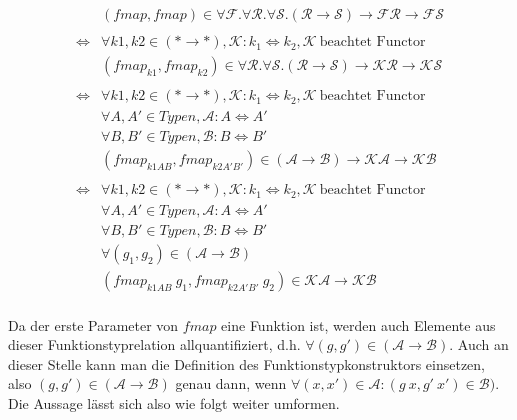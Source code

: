 \begin{align*}
&(fmap, fmap) \in \forall \mathcal{F} . \forall \mathcal{R} . \forall \mathcal{S} . (\mathcal{R} \rightarrow \mathcal{S})
\rightarrow \mathcal{F} \mathcal{R} \rightarrow \mathcal{F} \mathcal{S} \\
&\\
\Leftrightarrow &
\forall k1, k2 \in (* \rightarrow *), \mathcal{K} : k_1 \Leftrightarrow k_2, \mathcal{K}~\text{beachtet Functor} \\
&(fmap_{k1}, fmap_{k2}) \in \forall \mathcal{R} . \forall \mathcal{S} . (\mathcal{R} \rightarrow \mathcal{S}) \rightarrow
\mathcal{K} \mathcal{R} \rightarrow \mathcal{K} \mathcal{S} \\
&\\
\Leftrightarrow &
\forall k1, k2 \in (* \rightarrow *), \mathcal{K} : k_1 \Leftrightarrow k_2, \mathcal{K}~\text{beachtet Functor} \\
&\forall A, A' \in Typen, \mathcal{A} : A \Leftrightarrow A' \\
&\forall B, B' \in Typen, \mathcal{B} : B \Leftrightarrow B' \\
&(fmap_{k1 A B}, fmap_{k2 A' B'}) \in (\mathcal{A} \rightarrow \mathcal{B}) \rightarrow
\mathcal{K} \mathcal{A} \rightarrow \mathcal{K} \mathcal{B} \\
&\\
\Leftrightarrow &
\forall k1, k2 \in (* \rightarrow *), \mathcal{K} : k_1 \Leftrightarrow k_2, \mathcal{K}~\text{beachtet Functor} \\
&\forall A, A' \in Typen, \mathcal{A} : A \Leftrightarrow A' \\
&\forall B, B' \in Typen, \mathcal{B} : B \Leftrightarrow B' \\
&\forall (g_1, g_2) \in (\mathcal{A} \rightarrow \mathcal{B}) \\
&(fmap_{k1 A B}\ g_1, fmap_{k2 A' B'}\ g_2) \in \mathcal{K} \mathcal{A} \rightarrow \mathcal{K} \mathcal{B} \\
\end{align*}

Da der erste Parameter von $fmap$ eine Funktion ist, werden auch Elemente aus dieser Funktionstyprelation allquantifiziert, d.h.
$\forall (g, g') \in (\mathcal{A} \rightarrow \mathcal{B})$. Auch an dieser Stelle kann man die Definition des Funktionstypkonstruktors
einsetzen, also $(g, g') \in (\mathcal{A} \rightarrow \mathcal{B})$ genau dann, wenn $\forall (x, x') \in \mathcal{A}: (g\ x, g'\ x')
\in \mathcal{B})$. Die Aussage lässt sich also wie folgt weiter umformen.

